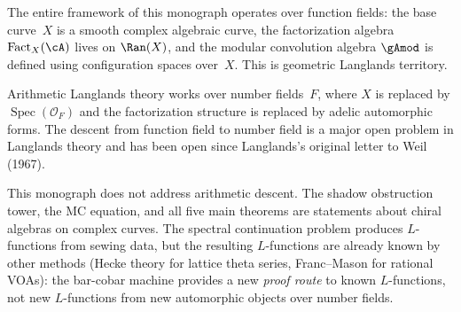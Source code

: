 \begin{remark}%
\label{rem:langlands-gap-b}%
%
%
\ClaimStatusConditional{}
The entire framework of this monograph operates over
function fields: the base curve~$X$ is a smooth complex
algebraic curve, the factorization algebra
$\mathrm{Fact}_X(\cA)$ lives on $\Ran(X)$, and the
modular convolution algebra $\gAmod$ is defined using
configuration spaces over~$X$. This is geometric
Langlands territory.

Arithmetic Langlands theory works over number
fields~$F$, where $X$ is replaced by
$\operatorname{Spec}(\mathcal{O}_F)$ and the
factorization structure is replaced by adelic
automorphic forms. The descent from function field to
number field is a major open problem in
Langlands theory and has been open since
Langlands's original letter to Weil (1967).

This monograph does not address arithmetic descent.
The shadow obstruction tower, the MC equation, and all five main
theorems are statements about chiral algebras on
complex curves. The spectral continuation problem
produces $L$-functions from sewing data, but the
resulting $L$-functions are already known by other
methods (Hecke theory for lattice theta series,
Franc--Mason for rational VOAs): the bar-cobar
machine provides a new \emph{proof route} to known
$L$-functions, not new $L$-functions from new
automorphic objects over number fields.
\end{remark}


